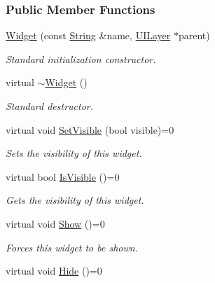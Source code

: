 \subsubsection*{Public Member Functions}
\begin{DoxyCompactItemize}
\item 
\hyperlink{classphys_1_1UI_1_1Widget_a270ffcb858d43bbf94b0ce2089a10607}{Widget} (const \hyperlink{namespacephys_aa03900411993de7fbfec4789bc1d392e}{String} \&name, \hyperlink{classphys_1_1UILayer}{UILayer} $\ast$parent)
\begin{DoxyCompactList}\small\item\em Standard initialization constructor. \item\end{DoxyCompactList}\item 
\hypertarget{classphys_1_1UI_1_1Widget_a95bde61e93544334b376938274617d15}{
virtual \hyperlink{classphys_1_1UI_1_1Widget_a95bde61e93544334b376938274617d15}{$\sim$Widget} ()}
\label{d9/d48/classphys_1_1UI_1_1Widget_a95bde61e93544334b376938274617d15}

\begin{DoxyCompactList}\small\item\em Standard destructor. \item\end{DoxyCompactList}\item 
virtual void \hyperlink{classphys_1_1UI_1_1Widget_ab049233d8d5522a6ab42654b8924a3e0}{SetVisible} (bool visible)=0
\begin{DoxyCompactList}\small\item\em Sets the visibility of this widget. \item\end{DoxyCompactList}\item 
virtual bool \hyperlink{classphys_1_1UI_1_1Widget_aaf1a1bd31b8e626467ce9cdb69bdf7ac}{IsVisible} ()=0
\begin{DoxyCompactList}\small\item\em Gets the visibility of this widget. \item\end{DoxyCompactList}\item 
\hypertarget{classphys_1_1UI_1_1Widget_aa53e64903afc4a1fecd066c814b6c8d4}{
virtual void \hyperlink{classphys_1_1UI_1_1Widget_aa53e64903afc4a1fecd066c814b6c8d4}{Show} ()=0}
\label{d9/d48/classphys_1_1UI_1_1Widget_aa53e64903afc4a1fecd066c814b6c8d4}

\begin{DoxyCompactList}\small\item\em Forces this widget to be shown. \item\end{DoxyCompactList}\item 
\hypertarget{classphys_1_1UI_1_1Widget_abc8e3f88f780e3b36b38086c45311795}{
virtual void \hyperlink{classphys_1_1UI_1_1Widget_abc8e3f88f780e3b36b38086c45311795}{Hide} ()=0}
\label{d9/d48/classphys_1_1UI_1_1Widget_abc8e3f88f780e3b36b38086c45311795}


\end{DoxyCompactItemize}
